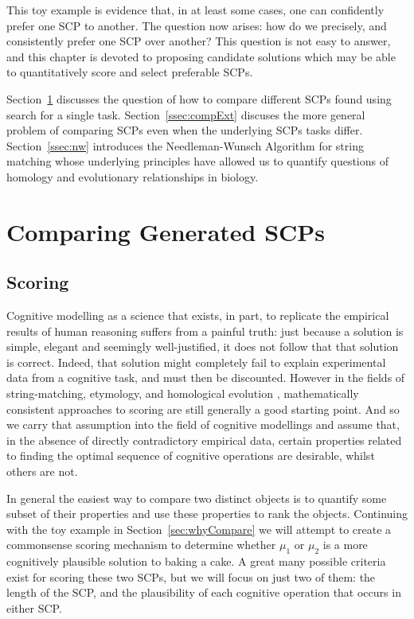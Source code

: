 This toy example is evidence that, in at least some cases, one can confidently prefer one SCP to another. The question now arises: how do we precisely, and consistently prefer one SCP over another? This question is not easy to answer, and this chapter is devoted to proposing candidate solutions which may be able to quantitatively score and select preferable SCPs.

Section~\ref{ssec:compGen} discusses the question of how to compare different SCPs found using search for a single task. Section~\ref{ssec:compExt} discuses the more general problem of comparing SCPs even when the underlying SCPs tasks differ. Section~\ref{ssec:nw} introduces the Needleman-Wunsch Algorithm for string matching whose underlying principles have allowed us to quantify questions of homology and evolutionary relationships in biology.

\section{Comparing Generated SCPs} \label{ssec:compGen}
\subsection{Scoring}
Cognitive modelling as a science that exists, in part, to replicate the empirical results of human reasoning suffers from a painful truth: just because a solution is simple, elegant and seemingly well-justified, it does not follow that that solution is correct. Indeed, that solution might completely fail to explain experimental data from a cognitive task, and must then be discounted. However in the fields of string-matching, etymology, and homological evolution \citep{sweetser1990etymology} \citep{needleman1970general} , mathematically consistent approaches to scoring are still generally a good starting point. And so we carry that assumption into the field of cognitive modellings and assume that, in the absence of directly contradictory empirical data, certain properties related to finding the optimal sequence of cognitive operations are desirable, whilst others are not.

In general the easiest way to compare two distinct objects is to quantify some subset of their properties and use these properties to rank the objects. Continuing with the toy example in Section~\ref{sec:whyCompare} we will attempt to create a commonsense scoring mechanism to determine whether $\mu_1$ or $\mu_2$ is a more cognitively plausible solution to baking a cake. A great many possible criteria exist for scoring these two SCPs, but we will focus on just two of them: the length of the SCP, and the plausibility of each cognitive operation that occurs in either SCP.

